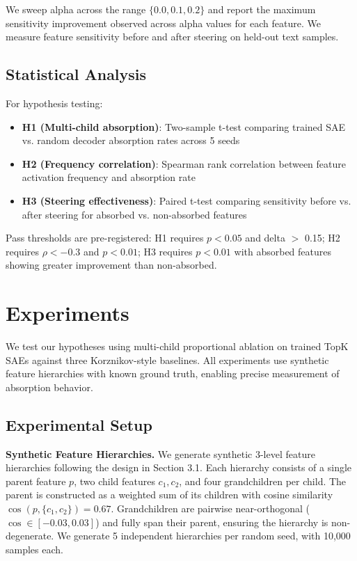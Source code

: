 \documentclass{article}
\begin{document}
We sweep alpha across the range $\{0.0, 0.1, 0.2\}$ and report the maximum sensitivity improvement observed across alpha values for each feature. We measure feature sensitivity before and after steering on held-out text samples.

\subsection{Statistical Analysis}

For hypothesis testing:

\begin{itemize}
\item \textbf{H1 (Multi-child absorption)}: Two-sample t-test comparing trained SAE vs. random decoder absorption rates across 5 seeds
\item \textbf{H2 (Frequency correlation)}: Spearman rank correlation between feature activation frequency and absorption rate
\item \textbf{H3 (Steering effectiveness)}: Paired t-test comparing sensitivity before vs. after steering for absorbed vs. non-absorbed features
\end{itemize}

Pass thresholds are pre-registered: H1 requires $p < 0.05$ and delta $>$ 0.15; H2 requires $\rho < -0.3$ and $p < 0.01$; H3 requires $p < 0.01$ with absorbed features showing greater improvement than non-absorbed.


\section{Experiments}

We test our hypotheses using multi-child proportional ablation on trained TopK SAEs against three Korznikov-style baselines. All experiments use synthetic feature hierarchies with known ground truth, enabling precise measurement of absorption behavior.

\subsection{Experimental Setup}

\textbf{Synthetic Feature Hierarchies.} We generate synthetic 3-level feature hierarchies following the design in Section 3.1. Each hierarchy consists of a single parent feature $p$, two child features $c_1, c_2$, and four grandchildren per child. The parent is constructed as a weighted sum of its children with cosine similarity $\cos(p, \{c_1, c_2\}) = 0.67$. Grandchildren are pairwise near-orthogonal ($\cos \in [-0.03, 0.03]$) and fully span their parent, ensuring the hierarchy is non-degenerate. We generate 5 independent hierarchies per random seed, with 10,000 samples each.
\end{document}
